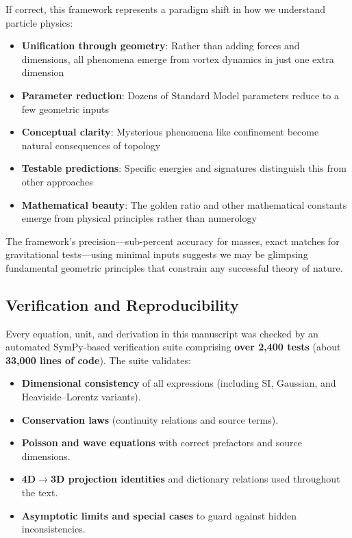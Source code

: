 If correct, this framework represents a paradigm shift in how we understand particle physics:

\begin{itemize}
\item \textbf{Unification through geometry}: Rather than adding forces and dimensions, all phenomena emerge from vortex dynamics in just one extra dimension
\item \textbf{Parameter reduction}: Dozens of Standard Model parameters reduce to a few geometric inputs
\item \textbf{Conceptual clarity}: Mysterious phenomena like confinement become natural consequences of topology
\item \textbf{Testable predictions}: Specific energies and signatures distinguish this from other approaches
\item \textbf{Mathematical beauty}: The golden ratio and other mathematical constants emerge from physical principles rather than numerology
\end{itemize}

The framework's precision---sub-percent accuracy for masses, exact matches for gravitational tests---using minimal inputs suggests we may be glimpsing fundamental geometric principles that constrain any successful theory of nature.

\subsection{Verification and Reproducibility}
\label{subsec:verification}

Every equation, unit, and derivation in this manuscript was checked by an automated SymPy-based verification suite comprising \textbf{over 2{,}400 tests} (about \textbf{33{,}000 lines of code}). The suite validates:
\begin{itemize}
  \item \textbf{Dimensional consistency} of all expressions (including SI, Gaussian, and Heaviside–Lorentz variants).
  \item \textbf{Conservation laws} (continuity relations and source terms).
  \item \textbf{Poisson and wave equations} with correct prefactors and source dimensions.
  \item \textbf{4D$\to$3D projection identities} and dictionary relations used throughout the text.
  \item \textbf{Asymptotic limits and special cases} to guard against hidden inconsistencies.
\end{itemize}

